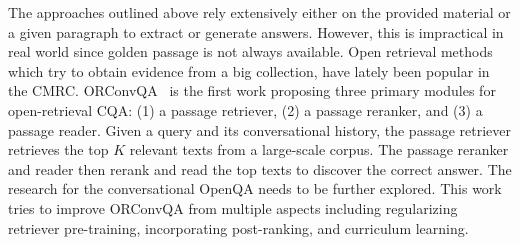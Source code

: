 The approaches outlined above rely extensively either on the provided material or a given paragraph to extract or generate answers. 
However, this is impractical in real world since golden passage is not always available. 
Open retrieval methods which try to obtain evidence from a big collection, have lately been popular in the CMRC. 
ORConvQA~\cite{qu2020open} is the first work proposing three primary modules for open-retrieval CQA: (1) a passage retriever, (2) a passage reranker, and (3) a passage reader. Given a query and its conversational history, the passage retriever retrieves the top $K$ relevant texts from a large-scale corpus. The passage reranker and reader then rerank and read the top texts to discover the correct answer. 
The research for the conversational OpenQA needs to be further explored. This work tries to improve ORConvQA from multiple aspects including regularizing retriever pre-training, incorporating post-ranking, and curriculum learning.




